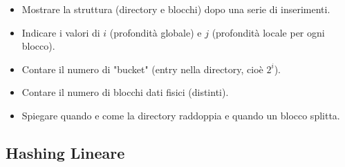 \begin{itemize}
    \begin{itemize}
        \item Mostrare la struttura (directory e blocchi) dopo una serie di inserimenti.
        \item Indicare i valori di $i$ (profondità globale) e $j$ (profondità locale per ogni blocco).
        \item Contare il numero di "bucket" (entry nella directory, cioè $2^i$).
        \item Contare il numero di blocchi dati fisici (distinti).
        \item Spiegare quando e come la directory raddoppia e quando un blocco splitta.
    \end{itemize}
\end{itemize}

\subsection{Hashing Lineare}
